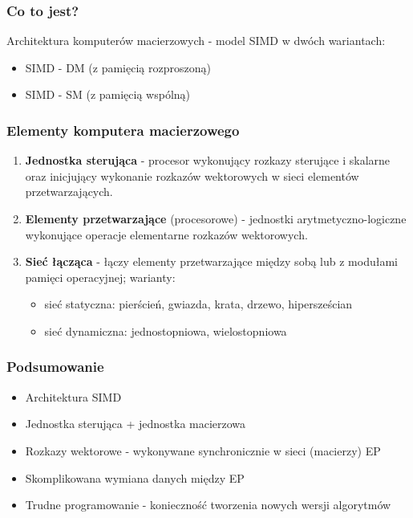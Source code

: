 \documentclass[a4paper,twoside]{article}
\begin{document}
			\subsubsection*{Co to jest?}
			Architektura komputerów macierzowych - model SIMD w dwóch wariantach:
			\begin{itemize}
				\item SIMD - DM (z pamięcią rozproszoną)
				\item SIMD - SM (z pamięcią wspólną)
			\end{itemize}
			
			\subsubsection*{Elementy komputera macierzowego}
			\begin{enumerate}
				\item \textbf{Jednostka sterująca} - procesor wykonujący rozkazy sterujące i skalarne oraz inicjujący wykonanie rozkazów wektorowych w sieci elementów przetwarzających.
				\item \textbf{Elementy przetwarzające} (procesorowe) - jednostki arytmetyczno-logiczne wykonujące operacje elementarne rozkazów wektorowych.
				\item \textbf{Sieć łącząca} - łączy elementy przetwarzające między sobą lub z modułami pamięci operacyjnej; warianty:
				\begin{itemize}
					\item sieć statyczna: pierścień, gwiazda, krata, drzewo, hipersześcian
					\item sieć dynamiczna: jednostopniowa, wielostopniowa
				\end{itemize}
			\end{enumerate}
			
			\subsubsection*{Podsumowanie}
			\begin{itemize}
				\item Architektura SIMD
				\item Jednostka sterująca + jednostka macierzowa
				\item Rozkazy wektorowe - wykonywane synchronicznie w sieci (macierzy) EP
				\item Skomplikowana wymiana danych między EP
				\item Trudne programowanie - konieczność tworzenia nowych wersji algorytmów
			\end{itemize}
			
\end{document}
